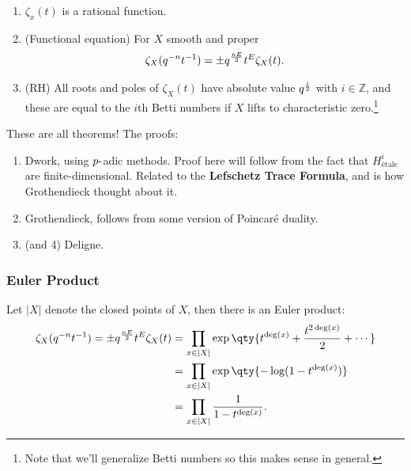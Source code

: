\begin{theorem}

\envlist

\begin{enumerate}
\def\labelenumi{\arabic{enumi}.}
\item
  \(\zeta_x(t)\) is a rational function.
\item
  (Functional equation) For \(X\) smooth and proper
  \begin{align*}  
  \zeta_X(q^{-n} t^{-1}) = \pm q^{nE \over 2} t^E \zeta_X(t)
  .\end{align*}
\item
  (RH) All roots and poles of \(\zeta_X(t)\) have absolute value
  \(q^{i\over 2}\) with \(i\in {\mathbb{Z}}\), and these are equal to
  the \(i\)th Betti numbers if \(X\) lifts to characteristic
  zero.\footnote{Note that we'll generalize Betti numbers so this makes
    sense in general.}
\end{enumerate}

\end{theorem}

\begin{remark}

These are all theorems! The proofs:

\begin{enumerate}
\def\labelenumi{\arabic{enumi}.}
\item
  Dwork, using \(p{\hbox{-}}\)adic methods. Proof here will follow from
  the fact that \(H^i_{\text{étale} }\) are finite-dimensional. Related
  to the \textbf{Lefschetz Trace Formula}, and is how Grothendieck
  thought about it.
\item
  Grothendieck, follows from some version of Poincaré duality.
\item
  (and 4) Deligne.
\end{enumerate}

\end{remark}

\hypertarget{euler-product-1}{%
\subsubsection{Euler Product}\label{euler-product-1}}

Let \({\left\lvert {X} \right\rvert}\) denote the closed points of
\(X\), then there is an Euler product:
\begin{align*}  
\zeta_X(q^{-n} t^{-1}) = \pm q^{nE \over 2} t^E \zeta_X(t)
&= \prod_{x\in {\left\lvert {X} \right\rvert}} \exp\qty{t^{\deg (x)} + {t^{2\deg (x)} \over 2} + \cdots} \\
&= \prod_{x\in {\left\lvert {X} \right\rvert}} \exp\qty{-\log(1-t^{\deg(x)})} \\
&= \prod_{x\in {\left\lvert {X} \right\rvert}} {1 \over 1 - t^{\deg(x)}}
.\end{align*}

